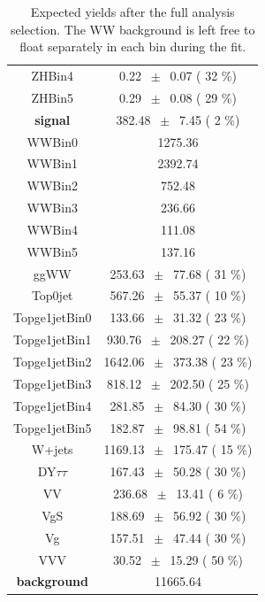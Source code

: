 \begin{table}[h!]
\begin{center}
{\begin{tabular}{ c  c  }
        ZHBin4   &       0.22 $~\pm~$       0.07 (        32 \%)  \\
        ZHBin5   &       0.29 $~\pm~$       0.08 (        29 \%)  \\
\hline
        {\bf signal}   &     382.48 $~\pm~$       7.45 (         2 \%)  \\
\hline
        WWBin0   &    1275.36       \\          
        WWBin1   &    2392.74       \\
        WWBin2   &     752.48       \\
        WWBin3   &     236.66       \\
        WWBin4   &     111.08       \\
        WWBin5   &     137.16       \\
          ggWW   &     253.63 $~\pm~$      77.68 (        31 \%)  \\
       Top0jet   &     567.26 $~\pm~$      55.37 (        10 \%)  \\
 Topge1jetBin0   &     133.66 $~\pm~$      31.32 (        23 \%)  \\
 Topge1jetBin1   &     930.76 $~\pm~$     208.27 (        22 \%)  \\
 Topge1jetBin2   &    1642.06 $~\pm~$     373.38 (        23 \%)  \\
 Topge1jetBin3   &     818.12 $~\pm~$     202.50 (        25 \%)  \\
 Topge1jetBin4   &     281.85 $~\pm~$      84.30 (        30 \%)  \\
 Topge1jetBin5   &     182.87 $~\pm~$      98.81 (        54 \%)  \\
          W+jets   &    1169.13 $~\pm~$     175.47 (        15 \%)  \\
          DY$\tau\tau$   &     167.43 $~\pm~$      50.28 (        30 \%)  \\
            VV   &     236.68 $~\pm~$      13.41 (         6 \%)  \\
           VgS   &     188.69 $~\pm~$      56.92 (        30 \%)  \\
            Vg   &     157.51 $~\pm~$      47.44 (        30 \%)  \\
           VVV   &      30.52 $~\pm~$      15.29 (        50 \%)  \\
\hline
    {\bf background}   &   11665.64  \\
\hline
\end{tabular}
}
\end{center}
\caption{Expected yields after the full analysis selection. The WW background is left free to float separately in each bin during the fit.}
\label{table:yields}
\end{table}

